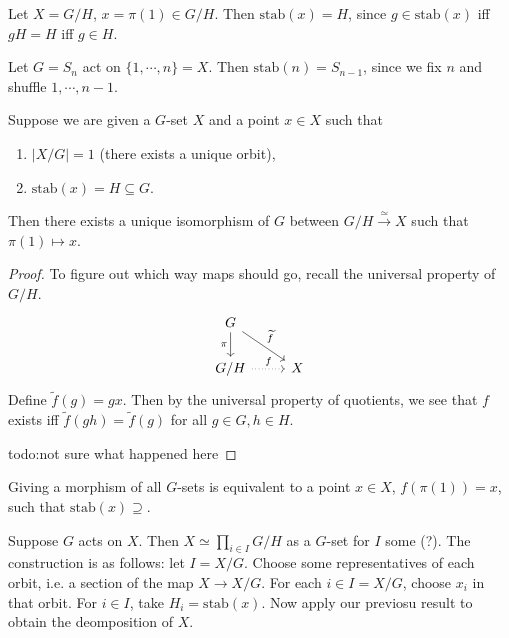 \begin{example}
    Let $X=G/H$, $x = \pi(1) \in G /H$. Then $\mathrm{stab}(x)=H$, since $g \in \mathrm{stab}(x) $ iff $gH=H$ iff $g \in H$.
\end{example}
\begin{example}
    Let $G=S_n $ act on $\{1,\cdots ,n\} =X$. Then $\mathrm{stab}(n)=S _{n-1}$, since we fix $n$ and shuffle $1,\cdots ,n-1$.
\end{example}
\begin{lemma}
    Suppose we are given a $G$-set $X$ and a point $x \in X$ such that 
    \begin{enumerate}[label=(\alph*)]
    \setlength\itemsep{-.2em}
\item $| X / G| =1$ (there exists a unique orbit),
\item $\mathrm{stab}(x)=H \subseteq G$.
    \end{enumerate}
    Then there exists a unique isomorphism of $G$ between $G / H \xrightarrow{\simeq } X$ such that $\pi(1) \mapsto x$.
\end{lemma}
\begin{proof}
     To figure out which way maps should go, recall the universal property of $G /H$.\[
     \begin{tikzcd}
G \arrow[d, "\pi"'] \arrow[rd, "\widetilde f"] &   \\
G/H \arrow[r, "f", dotted]                     & X
\end{tikzcd}
\] Define $\widetilde f(g)= gx$. Then by the universal property of quotients, we see that $f$ exists iff $\widetilde f(gh)= \widetilde f(g)$ for all $g \in G, h\in H$.

{\color{red}todo:not sure what happened here} 
\end{proof}

\begin{lemma}
    Giving a morphism of all $G$-sets is equivalent to a point $x \in X$, $f(\pi(1))=x$, such that $\mathrm{stab}(x) \supseteq$.
\end{lemma}

Suppose $G$ acts on $X$. Then $X \simeq  \prod _{ i \in I}G / H$ as a $G$-set for $I$ some (?). The construction is as follows: let $I= X /G$. Choose some representatives of each orbit, i.e. a section of the map $X \to  X / G$. For each $i \in I=X /G$, choose $x _i $ in that orbit. For $i \in I$, take $H_i = \mathrm{stab}(x)$. Now apply our previosu result to obtain the deomposition of $X$.
